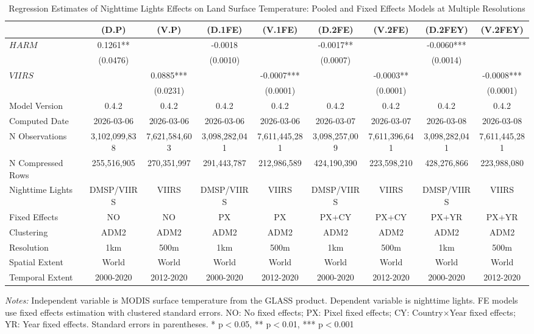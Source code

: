\begin{table}[htbp]
\centering
\footnotesize
\caption{Regression Estimates of Nighttime Lights Effects on Land Surface Temperature: Pooled and Fixed Effects Models at Multiple Resolutions}
\begin{tabular}{lcccccccc}
\toprule
 & (D.P) & (V.P) & (D.1FE) & (V.1FE) & (D.2FE) & (V.2FE) & (D.2FEY) & (V.2FEY) \\
\midrule
$HARM$ & 0.1261** &  & -0.0018 &  & -0.0017** &  & -0.0060*** &  \\
 & (0.0476) &  & (0.0010) &  & (0.0007) &  & (0.0014) &  \\
$VIIRS$ &  & 0.0885*** &  & -0.0007*** &  & -0.0003** &  & -0.0008*** \\
 &  & (0.0231) &  & (0.0001) &  & (0.0001) &  & (0.0001) \\
\midrule
Model Version & 0.4.2 & 0.4.2 & 0.4.2 & 0.4.2 & 0.4.2 & 0.4.2 & 0.4.2 & 0.4.2 \\
Computed Date & 2026-03-06 & 2026-03-06 & 2026-03-06 & 2026-03-06 & 2026-03-07 & 2026-03-07 & 2026-03-08 & 2026-03-08 \\
N Observations & 3,102,099,838 & 7,621,584,603 & 3,098,282,041 & 7,611,445,281 & 3,098,257,009 & 7,611,396,641 & 3,098,282,041 & 7,611,445,281 \\
N Compressed Rows & 255,516,905 & 270,351,997 & 291,443,787 & 212,986,589 & 424,190,390 & 223,598,210 & 428,276,866 & 223,988,080 \\
\midrule
Nighttime Lights & DMSP/VIIRS & VIIRS & DMSP/VIIRS & VIIRS & DMSP/VIIRS & VIIRS & DMSP/VIIRS & VIIRS \\
Fixed Effects & NO & NO & PX & PX & PX+CY & PX+CY & PX+YR & PX+YR \\
Clustering & ADM2 & ADM2 & ADM2 & ADM2 & ADM2 & ADM2 & ADM2 & ADM2 \\
Resolution & 1km & 500m & 1km & 500m & 1km & 500m & 1km & 500m \\
Spatial Extent & World & World & World & World & World & World & World & World \\
Temporal Extent & 2000-2020 & 2012-2020 & 2000-2020 & 2012-2020 & 2000-2020 & 2012-2020 & 2000-2020 & 2012-2020 \\
\bottomrule
\end{tabular}
\begin{threeparttable}
\begin{tablenotes}\small
\item \textit{Notes:} Independent variable is MODIS surface temperature from the GLASS product. Dependent variable is nighttime lights. FE models use  fixed effects estimation with clustered standard errors. NO: No fixed effects; PX: Pixel fixed effects; CY: Country×Year fixed effects; YR: Year fixed effects. Standard errors in parentheses. * p$<$0.05, ** p$<$0.01, *** p$<$0.001
\end{tablenotes}
\end{threeparttable}
\end{table}